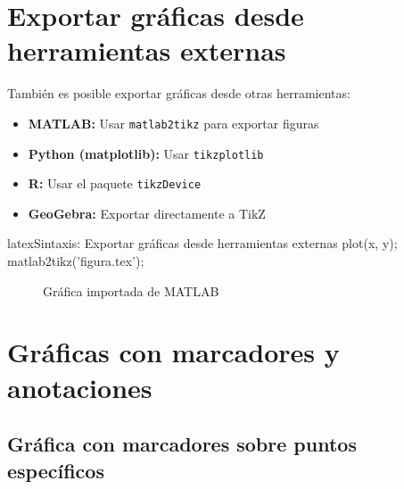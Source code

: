 \section{Exportar gráficas desde herramientas externas}
\label{sec:exportar-graficas}

También es posible exportar gráficas desde otras herramientas:

\begin{itemize}
  \item \textbf{MATLAB:} Usar \texttt{matlab2tikz} para exportar figuras
  \item \textbf{Python (matplotlib):} Usar \texttt{tikzplotlib}
  \item \textbf{R:} Usar el paquete \texttt{tikzDevice}
  \item \textbf{GeoGebra:} Exportar directamente a TikZ
\end{itemize}

\begin{codigosimple}{latex}{Sintaxis: Exportar gráficas desde herramientas externas}
plot(x, y);
matlab2tikz('figura.tex');

\begin{figure}[htbp]
  \centering
  
  \caption{Gráfica importada de MATLAB}
\end{figure}
\end{codigosimple}

\section{Gráficas con marcadores y anotaciones}
\label{sec:graficas-marcadores}

\subsection{Gráfica con marcadores sobre puntos específicos}
\label{subsec:marcadores-puntos}

